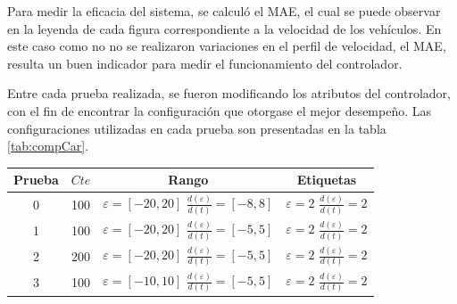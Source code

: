 Para medir la eficacia del sistema, se calculó el \gls{MAE}, el cual se puede observar en la leyenda de cada figura correspondiente a la velocidad de los vehículos. En este caso como no no se realizaron variaciones en el perfil de velocidad, el \gls{MAE}, resulta un buen indicador para medir el funcionamiento del controlador.

Entre cada prueba realizada, se fueron modificando los atributos del controlador, con el fin de encontrar la configuración que otorgase el mejor desempeño. Las configuraciones utilizadas en cada prueba son presentadas en la tabla \ref{tab:compCar}.

\begin{table}[!h]
\centering
\begin{tabular}{|c|c|c|c|}
\hline 
\rowcolor[gray]{0.9} Prueba &  $Cte$ & Rango & Etiquetas\\
\hline \hline 
0  & 100 & \parbox[t]{3cm} {\hspace{8 px} $\varepsilon=[-20,20]$ \\ $\frac{d(\varepsilon)}{d(t)}=[-8,8]$ \vspace{1mm}} &  \parbox[t]{3cm} {\hspace{11 px}$\varepsilon=2$\\ $\frac{d(\varepsilon)}{d(t)}=2$} \\ 
\hline 

1 & 100 & \parbox[t]{3cm} {\hspace{8 px} $\varepsilon=[-20,20]$ \\ $\frac{d(\varepsilon)}{d(t)}=[-5,5]$} &  \parbox[t]{3cm} {\hspace{11 px}$\varepsilon=2$\\ $\frac{d(\varepsilon)}{d(t)}=2$} \\ 
\hline 

2 & 200 & \parbox[t]{3cm} {\hspace{8 px} $\varepsilon=[-20,20]$ \\ $\frac{d(\varepsilon)}{d(t)}=[-5,5]$} &  \parbox[t]{3cm} {\hspace{11 px}$\varepsilon=2$\\ $\frac{d(\varepsilon)}{d(t)}=2$} \\ 
\hline 

3 & 100 & \parbox[t]{3cm} {\hspace{8 px} $\varepsilon=[-10,10]$ \\ $\frac{d(\varepsilon)}{d(t)}=[-5,5]$} &  \parbox[t]{3cm} {\hspace{11 px}$\varepsilon=2$\\ $\frac{d(\varepsilon)}{d(t)}=2$} \\ 
\hline 


\end{tabular}
\end{table}
